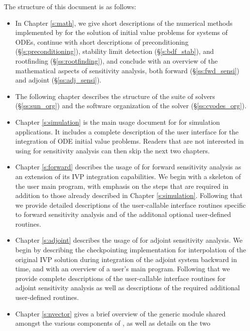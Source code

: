 The structure of this document is as follows:
\begin{itemize}
\item
  In Chapter \ref{s:math}, we give short descriptions of the numerical 
  methods implemented by {\cvodes} for the solution of initial value problems
  for systems of ODEs, continue with short descriptions of preconditioning
  (\S\ref{s:preconditioning}), stability limit detection (\S\ref{s:bdf_stab}),
  and rootfinding (\S\ref{ss:rootfinding}), and conclude with an overview of the
  mathematical aspects of sensitivity analysis, both forward (\S\ref{ss:fwd_sensi})
  and adjoint (\S\ref{ss:adj_sensi}).
\item
  The following chapter describes the structure of the {\sundials} suite
  of solvers (\S\ref{ss:sun_org}) and the software organization of the {\cvodes}
  solver (\S\ref{ss:cvodes_org}). 
\item
  Chapter \ref{s:simulation} is the main usage document for {\cvodes}
  for simulation applications.  It includes a complete description of
  the user interface for the integration of ODE initial value problems.
  Readers that are not interested in using {\cvodes} for sensitivity
  analysis can then skip the next two chapters.
\item
  Chapter \ref{s:forward} describes the usage of {\cvodes} for forward
  sensitivity analysis as an extension of its IVP integration
  capabilities.  We begin with a skeleton of the user main program,
  with emphasis on the steps that are required in addition to those
  already described in Chapter \ref{s:simulation}.  Following that we
  provide detailed descriptions of the user-callable interface
  routines specific to forward sensitivity analysis and of the
  additonal optional user-defined routines.
\item
  Chapter \ref{s:adjoint} describes the usage of {\cvodes} for adjoint
  sensitivity analysis. We begin by describing the {\cvodes} checkpointing 
  implementation for interpolation of the original IVP solution during
  integration of the adjoint system backward in time, and with 
  an overview of a user's main program. Following that we provide complete
  descriptions of the user-callable interface routines for adjoint sensitivity
  analysis as well as descriptions of the required additional user-defined routines.
\item
  Chapter \ref{s:nvector} gives a brief overview of the generic
  {\nvector} module shared amongst the various components of
  {\sundials}, as well as details on the two {\nvector}

\end{itemize}
